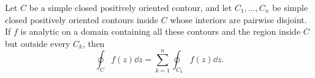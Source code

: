 \begin{theorem}\label{thm:deformation}
  Let $C$ be a simple closed positively oriented contour, and let
  $C_1, \dots, C_n$ be simple closed positively oriented contours inside $C$
  whose interiors are pairwise disjoint. If $f$ is analytic on a domain
  containing all these contours and the region inside $C$ but outside every
  $C_k$, then
  \[
    \oint_C f(z) \dd z = \sum_{k=1}^{n} \oint_{C_k} f(z) \dd z.
  \]
\end{theorem}
